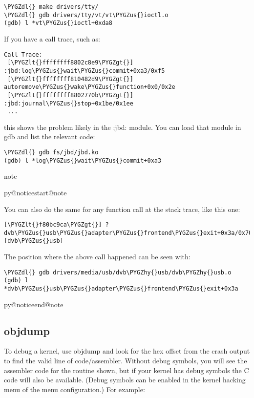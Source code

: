 \documentclass[a4paper,8pt,english]{sphinxmanual}
\makeatletter
\renewenvironment{notice}[2]{%
          \def\py@noticetype{#1}
          \begin{coloredbox}{#1}
          \bf\it
          \par\strong{#2}
          \csname py@noticestart@#1\endcsname
        }
	{
          \csname py@noticeend@\py@noticetype\endcsname
          \end{coloredbox}
        }
\def\PYGZus{\char`\_}
\def\PYGZlt{\char`\<}
\def\PYGZgt{\char`\>}
\def\PYGZdl{\char`\$}
\def\PYGZhy{\char`\-}
\makeatother
\begin{document}
\begin{Verbatim}[commandchars=\\\{\}]
\PYGZdl{} make drivers/tty/
\PYGZdl{} gdb drivers/tty/vt/vt\PYGZus{}ioctl.o
(gdb) l *vt\PYGZus{}ioctl+0xda8
\end{Verbatim}

If you have a call trace, such as:

\begin{Verbatim}[commandchars=\\\{\}]
Call Trace:
 [\PYGZlt{}ffffffff8802c8e9\PYGZgt{}] :jbd:log\PYGZus{}wait\PYGZus{}commit+0xa3/0xf5
 [\PYGZlt{}ffffffff810482d9\PYGZgt{}] autoremove\PYGZus{}wake\PYGZus{}function+0x0/0x2e
 [\PYGZlt{}ffffffff8802770b\PYGZgt{}] :jbd:journal\PYGZus{}stop+0x1be/0x1ee
 ...
\end{Verbatim}

this shows the problem likely in the :jbd: module. You can load that module
in gdb and list the relevant code:

\begin{Verbatim}[commandchars=\\\{\}]
\PYGZdl{} gdb fs/jbd/jbd.ko
(gdb) l *log\PYGZus{}wait\PYGZus{}commit+0xa3
\end{Verbatim}

\begin{notice}{note}{Note:}
You can also do the same for any function call at the stack trace,
like this one:

\begin{Verbatim}[commandchars=\\\{\}]
[\PYGZlt{}f80bc9ca\PYGZgt{}] ? dvb\PYGZus{}usb\PYGZus{}adapter\PYGZus{}frontend\PYGZus{}exit+0x3a/0x70 [dvb\PYGZus{}usb]
\end{Verbatim}

The position where the above call happened can be seen with:

\begin{Verbatim}[commandchars=\\\{\}]
\PYGZdl{} gdb drivers/media/usb/dvb\PYGZhy{}usb/dvb\PYGZhy{}usb.o
(gdb) l *dvb\PYGZus{}usb\PYGZus{}adapter\PYGZus{}frontend\PYGZus{}exit+0x3a
\end{Verbatim}
\end{notice}


\subsection{objdump}
\label{admin-guide/bug-hunting:objdump}
To debug a kernel, use objdump and look for the hex offset from the crash
output to find the valid line of code/assembler. Without debug symbols, you
will see the assembler code for the routine shown, but if your kernel has
debug symbols the C code will also be available. (Debug symbols can be enabled
in the kernel hacking menu of the menu configuration.) For example:
\end{document}
